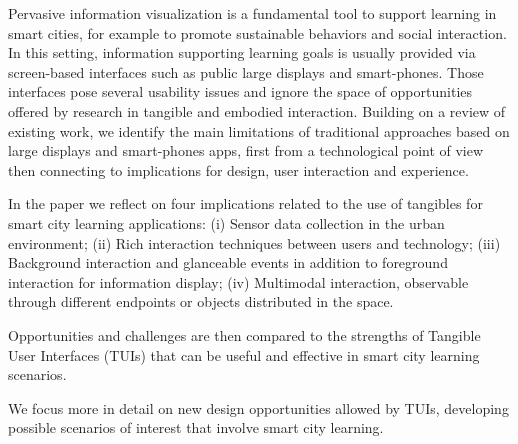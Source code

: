 Pervasive information visualization is a fundamental tool to support learning in smart cities, for example to promote sustainable behaviors and social interaction. In this setting, information supporting learning goals is usually provided via screen-based interfaces such as public large displays and smart-phones. Those interfaces pose several usability issues and ignore the space of opportunities offered by research in tangible and embodied interaction.
Building on a review of existing work, we identify the main limitations of traditional approaches based on large displays and smart-phones apps, first from a technological point of view then connecting to implications for design, user interaction and experience.

In the paper we reflect on four implications related to the use of tangibles for smart city learning applications: (i) Sensor data collection in the urban environment; (ii) Rich interaction techniques between users and technology; (iii) Background interaction and glanceable events in addition to foreground interaction for information display; (iv) Multimodal interaction, observable through different endpoints or objects distributed in the space.

Opportunities and challenges are then compared to the strengths of Tangible User Interfaces (TUIs) that can be useful and effective in smart city learning scenarios.

We focus more in detail on new design opportunities allowed by TUIs, developing possible scenarios of interest that involve smart city learning.
